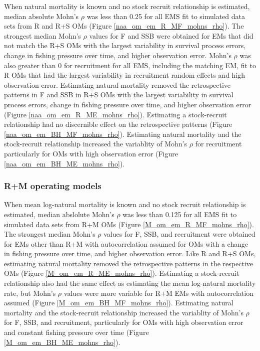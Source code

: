 \documentclass[
  12pt,
]{article}
\begin{document}
When natural mortality is known and no stock recruit relationship is
estimated, median absolute Mohn's \(\rho\) was less than 0.25 for all
EMS fit to simulated data sets from R and R+S OMs (Figure
\ref{naa_om_em_R_MF_mohns_rho}). The strongest median Mohn's \(\rho\)
values for F and SSB were obtained for EMs that did not match the R+S
OMs with the largest variability in survival process errors, change in
fishing pressure over time, and higher observation error. Mohn's
\(\rho\) was also greater than 0 for recruitment for all EMS, including
the matching EM, fit to R OMs that had the largest variability in
recruitment random effects and high observation error. Estimating
natural mortality removed the retrospective patterns in F and SSB in R+S
OMs with the largest variability in survival process errors, change in
fishing pressure over time, and higher observation error (Figure
\ref{naa_om_em_R_ME_mohns_rho}). Estimating a stock-recruit relationship
had no discernible effect on the retrospective patterns (Figure
\ref{naa_om_em_BH_MF_mohns_rho}). Estimating natural mortality and the
stock-recruit relationship increased the variablity of Mohn's \(\rho\)
for recruitment particularly for OMs with high observation error (Figure
\ref{naa_om_em_BH_ME_mohns_rho}).

\hypertarget{rm-operating-models-3}{%
\subsubsection*{R+M operating models}\label{rm-operating-models-3}}

When mean log-natural mortality is known and no stock recruit
relationship is estimated, median abslolute Mohn's \(\rho\) was less
than 0.125 for all EMS fit to simulated data sets from R+M OMs (Figure
\ref{M_om_em_R_MF_mohns_rho}). The strongest median Mohn's \(\rho\)
values for F, SSB, and recruitment were obtained for EMs other than R+M
with autocorrelation assumed for OMs with a change in fishing pressure
over time, and higher observation error. Like R and R+S OMs, estimating
natural mortality removed the retrospective patterns in the respective
OMs (Figure \ref{M_om_em_R_ME_mohns_rho}). Estimating a stock-recruit
relationship also had the same effect as estimating the mean log-natural
mortality rate, but Mohn's \(\rho\) values were more variable for R+M
EMs with autocorrelation assumed (Figure \ref{M_om_em_BH_MF_mohns_rho}).
Estimating natural mortality and the stock-recruit relationship
increased the variablity of Mohn's \(\rho\) for F, SSB, and recruitment,
particularly for OMs with high observation error and constant fishing
pressure over time (Figure \ref{M_om_em_BH_ME_mohns_rho}).
\end{document}

